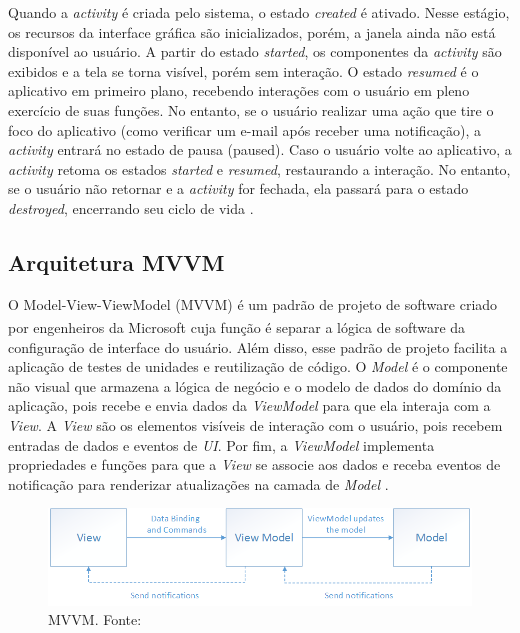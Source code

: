 Quando a \textit{activity} é criada pelo sistema, o estado \textit{created} é ativado. Nesse estágio, os recursos da interface gráfica 
são inicializados, porém, a janela ainda não está disponível ao usuário. A partir do estado \textit{started}, os componentes da \textit{activity} são exibidos e a tela se torna visível, porém sem interação.
O estado \textit{resumed} é o aplicativo em primeiro plano, recebendo interações com o usuário em pleno exercício de suas funções. No entanto, se o usuário realizar uma ação que tire 
o foco do aplicativo (como verificar um e-mail após receber uma notificação), a \textit{activity} entrará no estado de pausa (paused).
Caso o usuário volte ao aplicativo, a \textit{activity} retoma os estados \textit{started} e \textit{resumed}, restaurando a interação. No entanto, se o usuário não retornar e a \textit{activity} for fechada, 
ela passará para o estado \textit{destroyed}, encerrando seu ciclo de vida \cite{google-developers-activity-lifecycle}.

\subsection{Arquitetura MVVM}

O Model-View-ViewModel (MVVM) é um padrão de projeto de software criado por engenheiros da Microsoft\textsuperscript{\textregistered} 
cuja função é separar a lógica de software da configuração de interface do usuário. Além disso, esse padrão de projeto facilita a aplicação de testes de unidades e reutilização 
de código. O \textit{Model} é o componente não visual que armazena a lógica de negócio e o modelo de dados do domínio da aplicação, pois recebe e envia dados da \textit{ViewModel} 
para que ela interaja com a \textit{View}. A \textit{View} são os elementos visíveis de interação com o usuário, pois recebem entradas de dados e eventos de \textit{UI}. Por fim, a
\textit{ViewModel} implementa propriedades e funções para que a \textit{View} se associe aos dados e receba eventos de notificação para renderizar atualizações na camada de \textit{Model} \cite{mvvm-documentation}.

\begin{figure}[ht]
    \centering
    \includegraphics[width=.57\textwidth]{img/mvvm-pattern.png}
    \caption{MVVM. Fonte:\cite{mvvm-documentation}}\label{figMVVM}
\end{figure}

